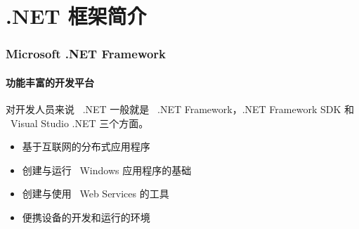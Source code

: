 \section{.NET 框架简介}

\begin{frame}
\frametitle{Microsoft .NET Framework}
\framesubtitle{功能丰富的开发平台}

\CJKindent 对开发人员来说 ~.NET 一般就是~ .NET Framework，.NET Framework SDK 和 ~Visual Studio .NET
三个方面。

\begin{itemize}
\item \large 基于互联网的分布式应用程序
\item \large 创建与运行 ~Windows 应用程序的基础
\item \large 创建与使用 ~Web Services 的工具
\item \large 便携设备的开发和运行的环境
\end{itemize}
\end{frame}

